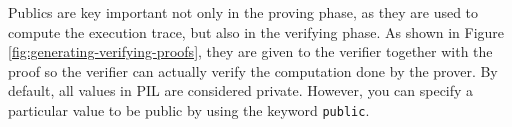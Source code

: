Publics are key important not only in the proving phase, as they are used to compute the execution trace, but also in the verifying phase. As shown in Figure \ref{fig:generating-verifying-proofs}, they are given to the verifier together with the proof so the verifier can actually verify the computation done by the prover. By default, all values in PIL are considered private. However, you can specify a particular value to be public by using the keyword \texttt{public}.


%
%
%
%
%
%
%



